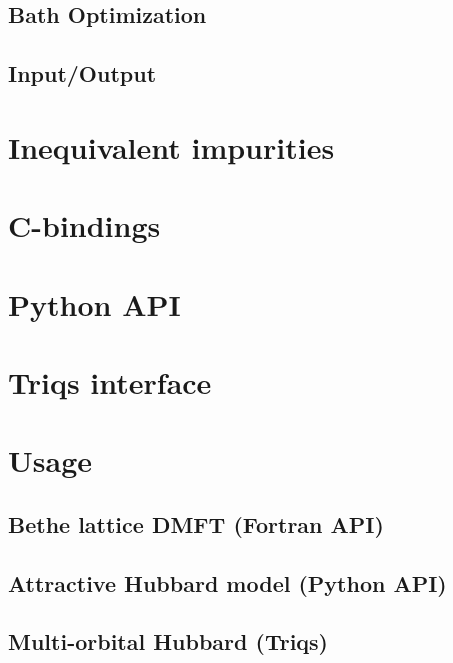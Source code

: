 \documentclass[final,3p,10pt]{elsarticle}
\begin{document}
\subsection{Bath Optimization}\label{sSecFit}

\subsection{Input/Output}\label{sSecIO}




\section{Inequivalent impurities}

\section{C-bindings}\label{SecCbind}

\section{Python API}

\section{Triqs interface}\label{SecEDI2Triqs}




\section{Usage}\label{SecUsage}
\subsection{Bethe lattice DMFT (Fortran API)}
\subsection{Attractive Hubbard model (Python API)}
\subsection{Multi-orbital Hubbard (Triqs)}
\end{document}

